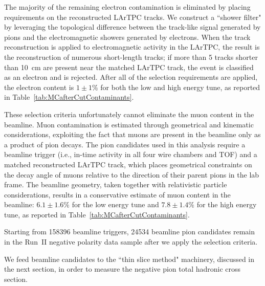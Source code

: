 \documentclass[%
 floatfix,
 reprint,
 twocolumn,
superscriptaddress,
showpacs,preprintnumbers,
 amsmath,amssymb,
 aps,
prd,
]{revtex4-1}
\begin{document}
The majority of the remaining electron contamination is eliminated by placing requirements on the reconstructed LArTPC tracks. We construct a ``shower filter" by leveraging the topological difference between the track-like signal generated by pions and the electromagnetic showers generated by electrons. 
When the track reconstruction is applied to electromagnetic activity in the LArTPC, the result is the reconstruction of numerous short-length tracks; if more than 5 tracks shorter than 10~cm are present near the matched LArTPC track, the event is classified as an electron and is rejected. After all of the selection requirements are applied, the electron content is $1 \pm 1\%$ for both the low and high energy tune, as reported in Table~\ref{tab:MCafterCutContaminants}.

These selection criteria unfortunately cannot eliminate the muon content in the beamline. Muon contamination is estimated through geometrical and kinematic considerations, exploiting the fact that  muons are present in the beamline only as a product of pion decays.  The pion candidates used in this analysis require a beamline trigger (i.e., in-time activity in all four wire chambers and TOF) and a matched reconstructed LArTPC track, which places geometrical constraints on the decay angle of muons relative to the direction of their parent pions in the lab frame. The beamline geometry, taken together with relativistic particle considerations, results in a conservative estimate of muon content in the beamline: $6.1 \pm 1.6 \%$ for the low energy tune and $7.8 \pm 1.4 \%$ for the high energy tune, as reported in Table~\ref{tab:MCafterCutContaminants}.



Starting from 158396 beamline triggers,  24534 beamline pion candidates remain in the Run~II negative polarity data sample after we apply the selection criteria. 

We feed beamline candidates to the ``thin slice method" machinery, discussed in the next section, in order to measure the negative pion total hadronic cross section. 
\end{document}
